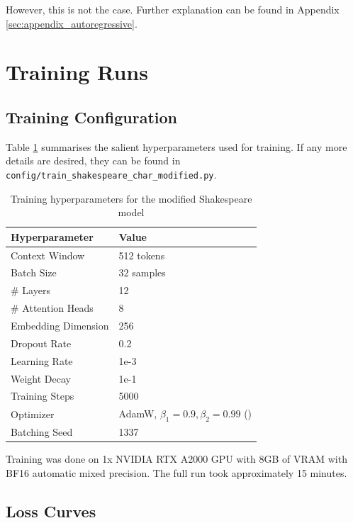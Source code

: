 \documentclass{article} %
\theoremstyle{definition}
\begin{document}
However, this is not the case. Further explanation can be found
in Appendix \ref{sec:appendix_autoregressive}.

\section{Training Runs}
\subsection{Training Configuration}
Table \ref{tab:training-hyperparameters} summarises the salient hyperparameters used for training.
If any more details are desired, they can be found in \texttt{config/train\_shakespeare\_char\_modified.py}.

\begin{table}
    \centering
    \begin{tabular}{|p{}|p{}|}
        \hline
        \textbf{Hyperparameter} & \textbf{Value} \\ \hline
        Context Window & 512 tokens \\ \hline
        Batch Size & 32 samples \\ \hline
        \# Layers & 12 \\ \hline
        \# Attention Heads & 8 \\ \hline
        Embedding Dimension & 256 \\ \hline
        Dropout Rate & 0.2 \\ \hline
        Learning Rate & 1e-3 \\ \hline
        Weight Decay & 1e-1 \\ \hline
        Training Steps & 5000 \\ \hline
        Optimizer & AdamW, $\beta_1 = 0.9, \beta_2 = 0.99$ (\cite{adamw})\\ \hline
        Batching Seed & 1337 \\ \hline
    \end{tabular}
    \caption{Training hyperparameters for the modified Shakespeare model}
    \label{tab:training-hyperparameters}
\end{table}

Training was done on 1x NVIDIA RTX A2000 GPU with 8GB of VRAM 
with BF16 automatic mixed precision. The full run took approximately 15 minutes.

\subsection{Loss Curves}
\end{document}
